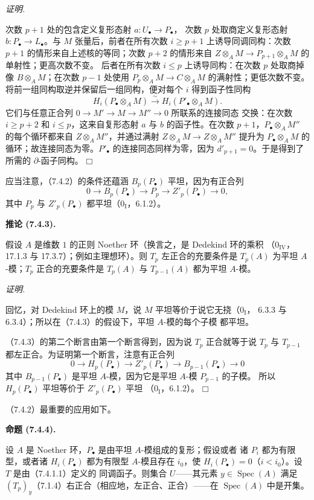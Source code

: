 \documentclass[UTF8,fontset=none,11pt,oneside,openany]{ctexbook}
\providecommand{\square}{\mdlgwhtsquare}
\newenvironment{proposition}[1][]{%
  \par\medskip\noindent\textbf{命题 (#1).}\ %
}{\par}
\newenvironment{corollary}[1][]{%
  \par\medskip\noindent\textbf{推论 (#1).}\ %
}{\par}
\newenvironment{proof}{%
  \par\smallskip\noindent\textit{证明.}\ %
}{\hfill$\square$\par}
\begin{document}
\begin{proof}
次数 $p+1$ 处的包含定义复形态射 $a:U_\bullet\to P_\bullet$，
次数 $p$ 处取商定义复形态射 $b:P_\bullet\to L_\bullet$。与 $M$
张量后，前者在所有次数 $i\geq p+1$ 上诱导同调同构：次数 $p+1$
的情形来自上述核的等同；次数 $p+2$ 的情形来自
$Z\otimes_A M\to P_{p+1}\otimes_A M$ 的单射性；更高次数不变。
后者在所有次数 $i\leq p$ 上诱导同构：在次数 $p$ 处取商掉像
$B\otimes_A M$；在次数 $p-1$ 处使用
$P_p\otimes_A M\to C\otimes_A M$ 的满射性；更低次数不变。
将前一组同构取逆并保留后一组同构，便对每个 $i$ 得到函子性同构
\[
 H_i(P_\bullet\otimes_A M)\xrightarrow{\sim}
 H_i(P'_\bullet\otimes_A M).
\]
它们与任意正合列 $0\to M'\to M\to M''\to0$ 所联系的连接同态
交换：在次数 $i\geq p+2$ 和 $i\leq p$，这来自复形态射 $a$ 与 $b$
的函子性。在次数 $p+1$，$P_\bullet\otimes_A M''$ 的每个循环都来自
$Z\otimes_A M''$，并通过满射 $Z\otimes_A M\to Z\otimes_A M''$
提升为 $P_\bullet\otimes_A M$ 的循环；故连接同态为零。$P'_\bullet$
的连接同态同样为零，因为 $d'_{p+1}=0$。于是得到了所需的
$\partial$-函子同构。
\end{proof}

应当注意，（7.4.2）的条件还蕴涵 $B_p(P_\bullet)$ 平坦，因为有正合列
\[
  0\longrightarrow B_p(P_\bullet)\longrightarrow P_p
  \longrightarrow Z'_p(P_\bullet)\longrightarrow0,
\]
其中 $P_p$ 与 $Z'_p(P_\bullet)$ 都平坦（$0_{\mathrm I}$，6.1.2）。

\begin{corollary}[7.4.3]
假设 $A$ 是维数 $1$ 的正则 Noether 环（换言之，是 Dedekind 环的乘积
（$0_{\mathrm{IV}}$，17.1.3 与 17.3.7）；例如主理想环）。则 $T_p$
左正合的充要条件是 $T_p(A)$ 为平坦 $A$-模；$T_p$ 正合的充要条件是
$T_p(A)$ 与 $T_{p-1}(A)$ 都为平坦 $A$-模。
\end{corollary}

\begin{proof}
回忆，对 Dedekind 环上的模 $M$，说 $M$ 平坦等价于说它无挠（$0_{\mathrm I}$，
6.3.3 与 6.3.4）；所以在（7.4.3）的假设下，平坦 $A$-模的每个子模
都平坦。

（7.4.3）的第二个断言由第一个断言得到，因为说 $T_p$ 正合就等于说
$T_p$ 与 $T_{p-1}$ 都左正合。为证明第一个断言，注意有正合列
\[
  0\longrightarrow H_p(P_\bullet)\longrightarrow Z'_p(P_\bullet)
  \longrightarrow B_{p-1}(P_\bullet)\longrightarrow0
\]
其中 $B_{p-1}(P_\bullet)$ 是平坦 $A$-模，因为它是平坦 $A$-模
$P_{p-1}$ 的子模。
所以 $H_p(P_\bullet)$ 平坦等价于 $Z'_p(P_\bullet)$ 平坦
（$0_{\mathrm I}$，6.1.2）。
\end{proof}

（7.4.2）最重要的应用如下。

\begin{proposition}[7.4.4]
设 $A$ 是 Noether 环，$P_\bullet$ 是由平坦 $A$-模组成的复形；假设或者
诸 $P_i$ 都为有限型，或者诸 $H_i(P_\bullet)$ 都为有限型 $A$-模且存在
$i_0$，使 $H_i(P_\bullet)=0$（$i<i_0$）。设 $T$ 是由（7.4.1.1）定义的
同调函子。则集合 $U$——其元素 $y\in\operatorname{Spec}(A)$ 满足
$(T_p)_y$（7.1.4）右正合（相应地，左正合、正合）——在
$\operatorname{Spec}(A)$ 中是开集。
\end{proposition}
\end{document}
